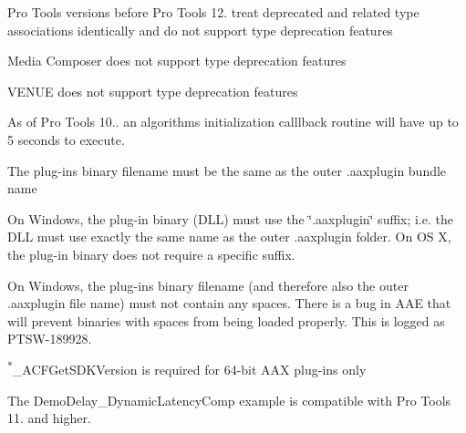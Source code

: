 \begin{DoxyRefList}
\begin{DoxyItemize}
\item Pro Tools versions before Pro Tools 12. treat deprecated and related type associations identically and do not support type deprecation features \item Media Composer does not support type deprecation features \item V\+E\+N\+U\+E does not support type deprecation features  \end{DoxyItemize}

\item[\label{a00381__compatibility_notes000002}%
\hypertarget{a00381__compatibility_notes000002}{}%
Module \hyperlink{a00327}{Common\+Interface\+\_\+\+Algorithm} ]As of Pro Tools 10.. an algorithm\textquotesingle{}s initialization calllback routine will have up to 5 seconds to execute. 
\item[\label{a00381__compatibility_notes000003}%
\hypertarget{a00381__compatibility_notes000003}{}%
Module \hyperlink{a00331}{Common\+Interface\+\_\+\+Format\+Specification} ]\begin{DoxyItemize}
\item The plug-\/in\textquotesingle{}s binary filename must be the same as the outer .aaxplugin bundle name \end{DoxyItemize}
\begin{DoxyItemize}
\item On Windows, the plug-\/in binary (D\+L\+L) must use the \char`\"{}.\+aaxplugin\char`\"{} suffix; i.\+e. the D\+L\+L must use exactly the same name as the outer .aaxplugin folder. On O\+S X, the plug-\/in binary does not require a specific suffix. \end{DoxyItemize}
\begin{DoxyItemize}
\item On Windows, the plug-\/in\textquotesingle{}s binary filename (and therefore also the outer .aaxplugin file name) must not contain any spaces. There is a bug in A\+A\+E that will prevent binaries with spaces from being loaded properly. This is logged as P\+T\+S\+W-\/189928.\end{DoxyItemize}
\textsuperscript{$\ast$}{\ttfamily \+\_\+\+A\+C\+F\+Get\+S\+D\+K\+Version} is required for 64-\/bit A\+A\+X plug-\/ins only 
\item[\label{a00381__compatibility_notes000009}%
\hypertarget{a00381__compatibility_notes000009}{}%
Module \hyperlink{a00376}{Example\+Plug\+Ins} ]The Demo\+Delay\+\_\+\+Dynamic\+Latency\+Comp example is compatible with Pro Tools 11. and higher.
\end{DoxyRefList}